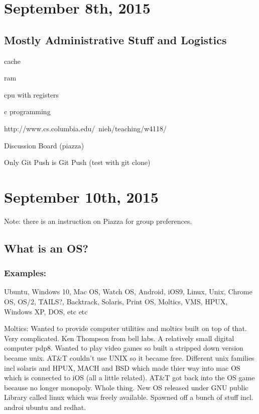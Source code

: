 \documentclass[10pt]{article}
\author{Adam Freilich}
\begin{document}
\section{September 8th, 2015}

\subsection{Mostly Administrative Stuff and Logistics}
cache

ram

cpu with registers

c programming

http://www.cs.columbia.edu/~nieh/teaching/w4118/

Discussion Board (piazza)

Only Git Push is Git Push (test with git clone)

\section{September 10th, 2015}


Note: there is an instruction on Piazza for group preferences. 


\subsection{What is an OS?}
\subsubsection{Examples:} Ubuntu, Windows 10, Mac OS, Watch OS, Android, iOS9, Linux, Unix, Chrome OS, OS/2, TAILS?, Backtrack, Solaris, Print OS, Moltics, VMS, HPUX, Windows XP, DOS, etc etc

Moltics: Wanted to provide computer utilities and moltics built on top of that. Very complicated. Ken Thompson from bell labs. A relatively small digital computer pdp8. Wanted to play video games so built a stripped down version became unix. AT\&T couldn't use UNIX so it became free. Different unix families incl solaris and HPUX, MACH and BSD which made thier way into mac OS which is connected to iOS (all a little related). AT\&T got back into the OS game because no longer monopoly. Whole thing. New OS released under GNU public Library called linux which was freely available. Spawned off a bunch of stuff incl. androi ubuntu and redhat. 
 
\end{document}
